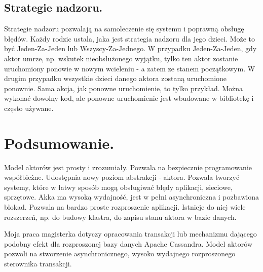 \documentclass[oneside, 11pt, a4paper]{article}
\begin{document}
\begin{multicols}{2}
\subsection{Strategie nadzoru.}
Strategie nadzoru pozwalają na samoleczenie się systemu i poprawną obsługę błędów. Każdy rodzic ustala, jaka jest strategia nadzoru dla jego dzieci. Może to być Jeden-Za-Jeden lub Wszyscy-Za-Jednego. W przypadku Jeden-Za-Jeden, gdy aktor umrze, np. wskutek nieobsłużonego wyjątku, tylko ten aktor zostanie uruchomiony ponowie w nowym wcieleniu - a zatem ze stanem początkowym. W drugim przypadku wszystkie dzieci danego aktora zostaną uruchomione ponownie. Sama akcja, jak ponowne uruchomienie, to tylko przykład. Można wykonać dowolny kod, ale ponowne uruchomienie jest wbudowane w bibliotekę i często używane.

\section{Podsumowanie.}
Model aktorów jest prosty i zrozumiały. Pozwala na bezpiecznie programowanie współbieżne. Udostępnia nowy poziom abstrakcji - aktora. Pozwala tworzyć systemy, które w łatwy sposób mogą obsługiwać błędy aplikacji, sieciowe, sprzętowe. \mbox{Akka} ma wysoką wydajność, jest w pełni asynchroniczna i pozbawiona blokad. Pozwala na bardzo proste rozproszenie aplikacji. Istnieje do niej wiele rozszerzeń, np. do budowy klastra, do zapisu stanu aktora w bazie danych.

Moja praca magisterka dotyczy opracowania transakcji lub mechanizmu dającego podobny efekt dla rozproszonej bazy danych Apache Cassandra. Model aktorów pozwoli na stworzenie asynchronicznego, wysoko wydajnego rozproszonego sterownika transakcji.



%
%
%
%
%
%
%


\end{multicols}
\end{document}
